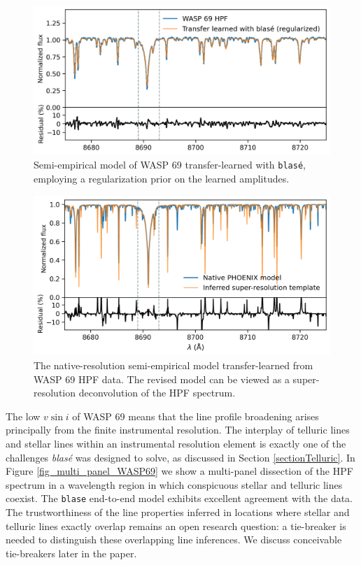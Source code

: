 \documentclass[twocolumn]{aastex631}
\begin{document}
\begin{figure}[hbt!]
    \centering
    \includegraphics[width=0.98\columnwidth]{blase_WASP69_regularized.png}
    \caption{Semi-empirical model of WASP 69 transfer-learned with \texttt{blas\'e}, employing a regularization prior on the learned amplitudes.}
    \label{fig_WASP69_transferred}
\end{figure}

\begin{figure}[hbt!]
    \centering
    \includegraphics[width=0.98\columnwidth]{blase_super_resolution_template.png}
    \caption{The native-resolution semi-empirical model transfer-learned from WASP 69 HPF data. The revised model can be viewed as a super-resolution deconvolution of the HPF spectrum.}
    \label{fig_WASP69_regularized}
\end{figure}


The low $v\sin{i}$ of WASP 69 means that the line profile broadening arises principally from the finite instrumental resolution.  The interplay of telluric lines and stellar lines within an instrumental resolution element is exactly one of the challenges  \emph{blas\'e} was designed to solve, as discussed in Section \ref{sectionTelluric}.  In Figure \ref{fig_multi_panel_WASP69} we show a multi-panel dissection of the HPF spectrum in a wavelength region in which conspicuous stellar and telluric lines coexist.  The  \texttt{blase} end-to-end model exhibits excellent agreement with the data.  The trustworthiness of the line properties inferred in locations where stellar and telluric lines exactly overlap remains an open research question: a tie-breaker is needed to distinguish these overlapping line inferences.  We discuss conceivable tie-breakers later in the paper.
\end{document}
